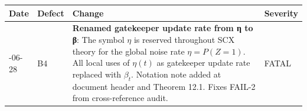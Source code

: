 \documentclass[
  12pt,
]{article}
\begin{document}
\begin{longtable}[]{@{}
  >{\raggedright\arraybackslash}p{}
  >{\raggedright\arraybackslash}p{}
  >{\raggedright\arraybackslash}p{}
  >{\raggedright\arraybackslash}p{}@{}}
\toprule\noalign{}
\begin{minipage}[b]{\linewidth}\raggedright
Date
\end{minipage} & \begin{minipage}[b]{\linewidth}\raggedright
Defect
\end{minipage} & \begin{minipage}[b]{\linewidth}\raggedright
Change
\end{minipage} & \begin{minipage}[b]{\linewidth}\raggedright
Severity
\end{minipage} \\
\midrule\noalign{}
\endhead
\bottomrule\noalign{}
\endlastfoot
2026-06-28 & B4 & \textbf{Renamed gatekeeper update rate from η to β}:
The symbol \(\eta\) is reserved throughout SCX theory for the global
noise rate \(\eta = P(Z=1)\). All local uses of \(\eta(t)\) as
gatekeeper update rate replaced with \(\beta_t\). Notation note added at
document header and Theorem 12.1. Fixes FAIL-2 from cross-reference
audit. & FATAL \\
\end{longtable}
\end{document}
